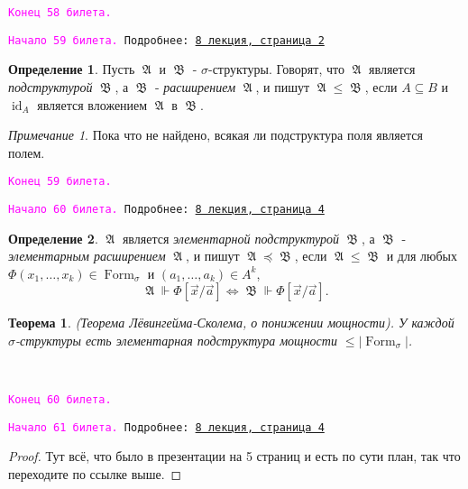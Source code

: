 \documentclass[a4paper,100pt]{article}
\theoremstyle{indented}
\newtheorem{theorem}{Теорема}
\theoremstyle{definition}
\newtheorem{defn}{Определение}
\theoremstyle{remark}
\newtheorem{remark}{Примечание}
\DeclareMathOperator{\Llra}{\Longleftrightarrow}
\DeclareMathOperator{\id}{id}
\DeclareMathOperator{\form}{Form}
\DeclareMathOperator{\GA}{\mathfrak{A}}
\DeclareMathOperator{\GB}{\mathfrak{B}}
\begin{document}
\texttt{\textcolor{magenta}{Конец 58 билета.}} 

\hrulefill

\texttt{\hypertarget{b59}{\textcolor{magenta}{Начало 59 билета.}} Подробнее: \href{http://www.mi-ras.ru/~speranski/courses/logic-1-2021-spring/slides_8.pdf}{8 лекция, страница 2}} 

\begin{defn}
  Пусть $\GA$ и $\GB$ - $\sigma$-структуры. Говорят, что $\GA$ является \textit{подструктурой} $\GB$, а $\GB$ - \textit{расширением} $\GA$, и пишут $\GA \leq \GB$, если $A \subseteq B$ и $\id_A$ является вложением $\GA$ в $\GB$. 
\end{defn}

\begin{remark}
  Пока что не найдено, всякая ли подструктура поля является полем.
\end{remark}

\texttt{\textcolor{magenta}{Конец 59 билета.}} 

\hrulefill

\texttt{\hypertarget{b60}{\textcolor{magenta}{Начало 60 билета.}} Подробнее: \href{http://www.mi-ras.ru/~speranski/courses/logic-1-2021-spring/slides_8.pdf}{8 лекция, страница 4}} 

\begin{defn}
  $\GA$ является \textit{элементарной подструктурой} $\GB$, а $\GB$ - \textit{элементарным расширением} $\GA$, и пишут $\GA \preccurlyeq \GB$, если $\GA \leq \GB$ и для любых $\Phi(x_1, \ldots, x_k)\in \form_\sigma$ и $(a_1, \ldots, a_k)\in A^k$, 
  \[
    \GA \Vdash \Phi[\vec{x}/\vec{a}] \Llra \GB \Vdash \Phi[\vec{x}/\vec{a}].
  \]
\end{defn}

\begin{theorem}
  (Теорема Лёвингейма-Сколема, о понижении мощности). У каждой $\sigma$-структуры есть элементарная подструктура мощности $\leq |\form_\sigma|$. 
\end{theorem} \

\texttt{\textcolor{magenta}{Конец 60 билета.}} 

\hrulefill

\texttt{\hypertarget{b61}{\textcolor{magenta}{Начало 61 билета.}} Подробнее: \href{http://www.mi-ras.ru/~speranski/courses/logic-1-2021-spring/slides_8.pdf}{8 лекция, страница 4}} 

\begin{proof}
  Тут всё, что было в презентации на 5 страниц и есть по сути план, так что переходите по ссылке выше.
\end{proof}
\end{document}
